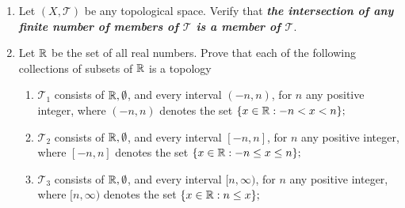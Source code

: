 \documentclass[10pt,a4paper]{report}
\newcommand{\TT}{\mathcal{T}}
\begin{document}
\begin{enumerate}
\noindent
{}

\item Let $(X, \TT)$ be any topological space.  Verify that \textbf{\textit{the intersection of any finite number of members of $\TT$ is a member of $\TT$}}.

\item Let $\mathbb{R}$ be the set of all real numbers.  Prove that each of the following collections of subsets of $\mathbb{R}$ is a topology
\begin{enumerate}[label=(\roman*)]
	\item $\TT_1$ consists of $\mathbb{R}, \emptyset$, and every interval $(-n,n)$, for $n$ any positive integer, where $(-n,n)$ denotes the set $\{x \in\mathbb{R}:-n<x<n\};$
	\item $\TT_2$ consists of $\mathbb{R}, \emptyset$, and every interval $[-n,n]$, for $n$ any positive integer, where $[-n,n]$ denotes the set $\{x \in\mathbb{R}:-n\le x\le n\};$
	\item $\TT_3$ consists of $\mathbb{R}, \emptyset$, and every interval $[n,\infty)$, for $n$ any positive integer, where $[n,\infty)$ denotes the set $\{x \in\mathbb{R}:n\le x\};$
\end{enumerate}


\end{enumerate}
\end{document}
